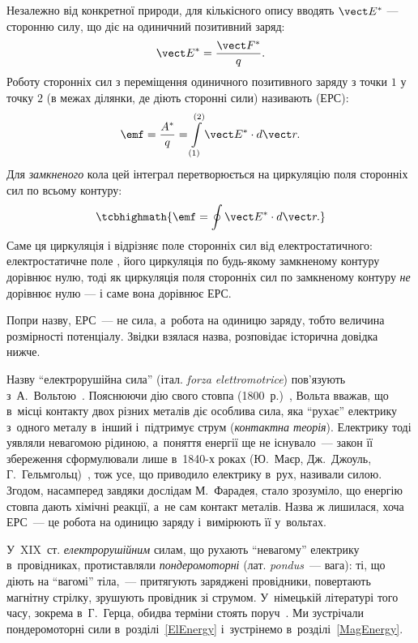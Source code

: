 Незалежно від конкретної природи, для кількісного опису вводять  $\vect E^*$ --- сторонню силу, що діє на
одиничний позитивний заряд:
\begin{equation}\label{eq:ExtraneousForceField}
	\vect E^* = \frac{\vect F^*}{q}.
\end{equation}
Роботу сторонніх сил з переміщення одиничного позитивного заряду з точки $1$ у точку $2$ (в межах ділянки, де діють сторонні сили)
називають  (ЕРС):
\begin{equation}\label{eq:EMFDef}
		\emf = \frac{A^*}{q} = \int\limits_{(1)}^{(2)} \vect E^* \cdot d\vect r.
\end{equation}
Для \emph{замкненого} кола цей інтеграл перетворюється на циркуляцію поля сторонніх сил по всьому контуру:
\begin{equation}\label{eq:EMFClosedLoop}
	\tcbhighmath{
		\emf = \oint \vect E^* \cdot d\vect r.
	}
\end{equation}
Саме ця циркуляція і відрізняє поле сторонніх сил від електростатичного: електростатичне поле , його циркуляція
по будь-якому замкненому контуру дорівнює нулю, тоді як циркуляція поля сторонніх сил по замкненому контуру \emph{не} дорівнює
нулю --- і саме вона дорівнює ЕРС.

Попри назву, ЕРС~--- не сила, а~робота на одиницю заряду, тобто величина розмірності
потенціалу. Звідки взялася назва, розповідає історична довідка нижче.

\begin{Historical}
	Назву \enquote{електрорушійна сила} (італ. \textit{forza elettromotrice}) пов'язують з~А.~Вольтою~\cite{Pancaldi2003}. Пояснюючи дію свого
	стовпа (1800~р.)~\cite{Volta1800}, Вольта вважав, що в~місці контакту двох різних металів діє особлива сила, яка \enquote{рухає} електрику
	з~одного металу в~інший і~підтримує струм (\emph{контактна теорія}). Електрику тоді уявляли невагомою рідиною, а~поняття
	енергії ще не існувало~--- закон її збереження сформулювали лише в~1840-х роках (Ю.~Маєр, Дж.~Джоуль, Г.~Гельмгольц)~\cite{Kuhn1959}, тож
	усе, що приводило електрику в~рух, називали силою. Згодом, насамперед завдяки дослідам М.~Фарадея, стало зрозуміло, що
	енергію стовпа дають хімічні реакції, а~не сам контакт металів. Назва ж лишилася, хоча ЕРС~--- це робота на одиницю заряду
	і~вимірюють її у~вольтах.

	У~XIX~ст. \emph{електрорушійним} силам, що рухають \enquote{невагому} електрику в~провідниках, протиставляли
	\emph{пондеромоторні} (лат. \textit{pondus}~--- вага): ті, що діють на \enquote{вагомі} тіла,~--- притягують заряджені
	провідники, повертають магнітну стрілку, зрушують провідник зі струмом. У~німецькій літературі того часу, зокрема
	в~Г.~Герца, обидва терміни стоять поруч~\cite{Hertz1893ElectricWaves}. Ми зустрічали пондеромоторні сили в~розділі~\ref{ElEnergy} і~зустрінемо в~розділі~\ref{MagEnergy}.
\end{Historical}

